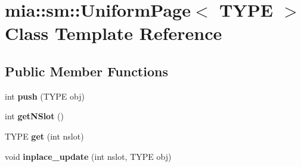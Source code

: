 \hypertarget{classmia_1_1sm_1_1_uniform_page}{\section{mia\-:\-:sm\-:\-:Uniform\-Page$<$ T\-Y\-P\-E $>$ Class Template Reference}
\label{classmia_1_1sm_1_1_uniform_page}
}
\subsection*{Public Member Functions}
\begin{DoxyCompactItemize}
\item 
\hypertarget{classmia_1_1sm_1_1_uniform_page_a40192fe8c4807d001b501f12ece71726}{int {\bfseries push} (T\-Y\-P\-E obj)}\label{classmia_1_1sm_1_1_uniform_page_a40192fe8c4807d001b501f12ece71726}

\item 
\hypertarget{classmia_1_1sm_1_1_uniform_page_a1b4d3b4d6da50af483ecc12c9db752e1}{int {\bfseries get\-N\-Slot} ()}\label{classmia_1_1sm_1_1_uniform_page_a1b4d3b4d6da50af483ecc12c9db752e1}

\item 
\hypertarget{classmia_1_1sm_1_1_uniform_page_a4564403c3e09a938039b40664cab9889}{T\-Y\-P\-E {\bfseries get} (int nslot)}\label{classmia_1_1sm_1_1_uniform_page_a4564403c3e09a938039b40664cab9889}

\item 
\hypertarget{classmia_1_1sm_1_1_uniform_page_a3d88ab95f4dd9758fe4dd77cc2b25fa1}{void {\bfseries inplace\-\_\-update} (int nslot, T\-Y\-P\-E obj)}\label{classmia_1_1sm_1_1_uniform_page_a3d88ab95f4dd9758fe4dd77cc2b25fa1}

\end{DoxyCompactItemize}
